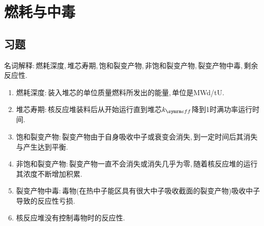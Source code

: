 \chapter{燃耗与中毒}
\section*{习题}

\begin{exercise}
    名词解释:\,燃耗深度,\,堆芯寿期,\,饱和裂变产物,\,非饱和裂变产物,\,裂变产物中毒,\,剩余反应性.\,
    \begin{solution}
        \begin{enumerate}[(1)]
            \item 燃耗深度:\,装入堆芯的单位质量燃料所发出的能量,\,单位是MWd/tU.\,
            \item 堆芯寿期:\,核反应堆装料后从开始运行直到堆芯$\keff$降到1时满功率运行时间.\,
            \item 饱和裂变产物:\,裂变产物由于自身吸收中子或衰变会消失,\,到一定时间后其消失与产生达到平衡.\,
            \item 非饱和裂变产物:\,裂变产物一直不会消失或消失几乎为零,\,随着核反应堆的运行其浓度不断增加积累.\,
            \item 裂变产物中毒:\,毒物(在热中子能区具有很大中子吸收截面的裂变产物)吸收中子导致的反应性亏损.\,
            \item 核反应堆没有控制毒物时的反应性.\,
        \end{enumerate}
    \end{solution}
\end{exercise}

